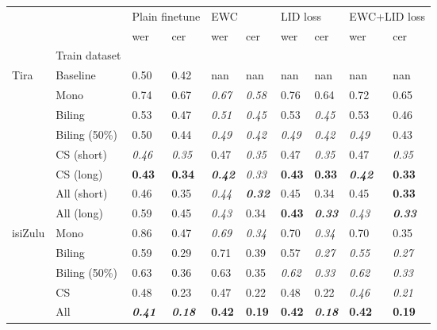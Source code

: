 \begin{tabular}{llllllllll}
\toprule
 &  & \multicolumn{2}{l}{Plain finetune} & \multicolumn{2}{l}{EWC} & \multicolumn{2}{l}{LID loss} & \multicolumn{2}{l}{EWC+LID loss} \\
 &  & wer & cer & wer & cer & wer & cer & wer & cer \\
 & Train dataset &  &  &  &  &  &  &  &  \\
\midrule
Tira & Baseline & 0.50 & 0.42 & nan & nan & nan & nan & nan & nan \\
 & Mono & 0.74 & 0.67 & \textit{0.67} & \textit{0.58} & 0.76 & 0.64 & 0.72 & 0.65 \\
 & Biling & 0.53 & 0.47 & \textit{0.51} & \textit{0.45} & 0.53 & \textit{0.45} & 0.53 & 0.46 \\
 & Biling (50\%) & 0.50 & 0.44 & \textit{0.49} & \textit{0.42} & \textit{0.49} & \textit{0.42} & \textit{0.49} & 0.43 \\
 & CS (short) & \textit{0.46} & \textit{0.35} & 0.47 & \textit{0.35} & 0.47 & \textit{0.35} & 0.47 & \textit{0.35} \\
 & CS (long) & \textbf{0.43} & \textbf{0.34} & \textit{\textbf{0.42}} & \textit{0.33} & \textbf{0.43} & \textbf{0.33} & \textit{\textbf{0.42}} & \textbf{0.33} \\
 & All (short) & 0.46 & 0.35 & \textit{0.44} & \textit{\textbf{0.32}} & 0.45 & 0.34 & 0.45 & \textbf{0.33} \\
 & All (long) & 0.59 & 0.45 & \textit{0.43} & 0.34 & \textbf{0.43} & \textit{\textbf{0.33}} & \textit{0.43} & \textit{\textbf{0.33}} \\
isiZulu & Mono & 0.86 & 0.47 & \textit{0.69} & \textit{0.34} & 0.70 & \textit{0.34} & 0.70 & 0.35 \\
 & Biling & 0.59 & 0.29 & 0.71 & 0.39 & 0.57 & \textit{0.27} & \textit{0.55} & \textit{0.27} \\
 & Biling (50\%) & 0.63 & 0.36 & 0.63 & 0.35 & \textit{0.62} & \textit{0.33} & \textit{0.62} & \textit{0.33} \\
 & CS & 0.48 & 0.23 & 0.47 & 0.22 & 0.48 & 0.22 & \textit{0.46} & \textit{0.21} \\
 & All & \textit{\textbf{0.41}} & \textit{\textbf{0.18}} & \textbf{0.42} & \textbf{0.19} & \textbf{0.42} & \textit{\textbf{0.18}} & \textbf{0.42} & \textbf{0.19} \\
\bottomrule
\end{tabular}

